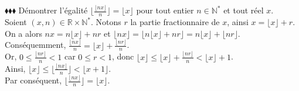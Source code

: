 \documentclass[11pt]{article}
\begin{document}
\begin{exercice}{$\blacklozenge\blacklozenge\blacklozenge$}{}
    Démontrer l'égalité $\lfloor\frac{\lfloor{nx}\rfloor}{n}\rfloor=\lfloor{x}\rfloor$ pour tout entier $n\in\mathbb{N}^*$ et tout réel $x$.\\
    Soient $(x,n)\in\mathbb{R}\times\mathbb{N}^*$.
    \tcblower
    Notons $r$ la partie fractionnaire de $x$, ainsi $x=\lfloor{x}\rfloor+r$.\\
    On a alors $nx=n\lfloor{x}\rfloor+nr$ et $\lfloor{nx}\rfloor=\lfloor{n\lfloor{x}\rfloor+nr}\rfloor=n\lfloor{x}\rfloor+\lfloor{nr}\rfloor$.\\
    Conséquemment, $\frac{\lfloor{nx}\rfloor}{n}=\lfloor{x}\rfloor+\frac{\lfloor{nr}\rfloor}{n}$.\\
    Or, $0\leq\frac{\lfloor{nr}\rfloor}{n}<1$ car $0\leq r<1$, donc $\lfloor{x}\rfloor\leq\lfloor{x}\rfloor+\frac{\lfloor{nr}\rfloor}{n}<\lfloor{x}\rfloor+1$.\\
    Ainsi, $\lfloor{x}\rfloor\leq\lfloor\frac{\lfloor{nx}\rfloor}{n}\rfloor<\lfloor{x}+1\rfloor$.\\
    Par conséquent, $\lfloor\frac{\lfloor{nx}\rfloor}{n}\rfloor = \lfloor{x}\rfloor$.
\end{exercice}
\end{document}
